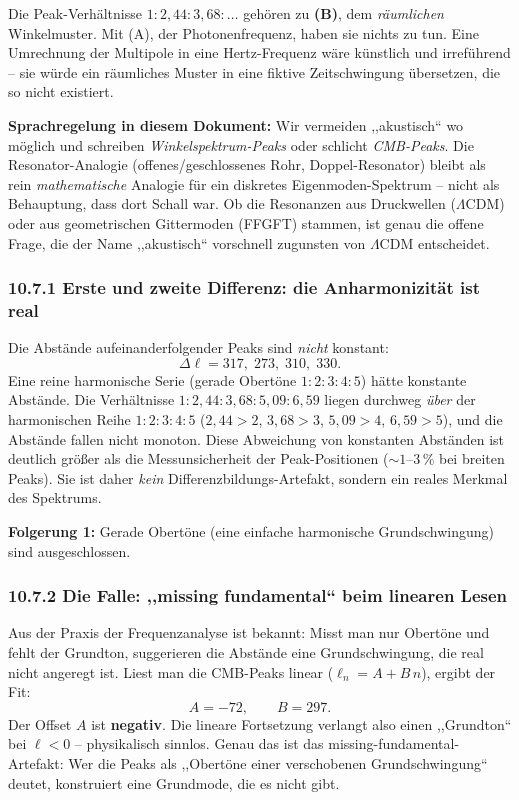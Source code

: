 Die Peak-Verhältnisse $1:2{,}44:3{,}68:\ldots$ gehören zu \textbf{(B)},
dem \emph{räumlichen} Winkelmuster. Mit (A), der Photonenfrequenz, haben
sie nichts zu tun. Eine Umrechnung der Multipole in eine Hertz-Frequenz
wäre künstlich und irreführend -- sie würde ein räumliches Muster in
eine fiktive Zeitschwingung übersetzen, die so nicht existiert.

\textbf{Sprachregelung in diesem Dokument:} Wir vermeiden ,,akustisch``
wo möglich und schreiben \emph{Winkelspektrum-Peaks} oder schlicht
\emph{CMB-Peaks}. Die Resonator-Analogie (offenes/geschlossenes Rohr,
Doppel-Resonator) bleibt als rein \emph{mathematische} Analogie für ein
diskretes Eigenmoden-Spektrum -- nicht als Behauptung, dass dort Schall
war. Ob die Resonanzen aus Druckwellen ($\Lambda$CDM) oder aus
geometrischen Gittermoden (FFGFT) stammen, ist genau die offene Frage,
die der Name ,,akustisch`` vorschnell zugunsten von $\Lambda$CDM
entscheidet.

\subsubsection*{10.7.1 Erste und zweite Differenz: die Anharmonizität ist real}

Die Abstände aufeinanderfolgender Peaks sind \emph{nicht} konstant:
\[
  \Delta\ell = 317,\; 273,\; 310,\; 330.
\]
Eine reine harmonische Serie (gerade Obertöne $1:2:3:4:5$) hätte
konstante Abstände. Die Verhältnisse $1:2{,}44:3{,}68:5{,}09:6{,}59$
liegen durchweg \emph{über} der harmonischen Reihe $1:2:3:4:5$
($2{,}44>2$, $3{,}68>3$, $5{,}09>4$, $6{,}59>5$), und die Abstände fallen
nicht monoton. Diese Abweichung von konstanten Abständen ist deutlich größer
als die Messunsicherheit der Peak-Positionen ($\sim 1$--$3\,\%$ bei breiten
Peaks). Sie ist daher \emph{kein} Differenzbildungs-Artefakt, sondern
ein reales Merkmal des Spektrums.

\textbf{Folgerung 1:} Gerade Obertöne (eine einfache harmonische
Grundschwingung) sind ausgeschlossen.

\subsubsection*{10.7.2 Die Falle: ,,missing fundamental`` beim linearen Lesen}

Aus der Praxis der Frequenzanalyse ist bekannt: Misst man nur Obertöne
und fehlt der Grundton, suggerieren die Abstände eine Grundschwingung,
die real nicht angeregt ist. Liest man die CMB-Peaks linear
($\ell_n = A + B\,n$), ergibt der Fit:
\[
  A = -72, \qquad B = 297.
\]
Der Offset $A$ ist \textbf{negativ}. Die lineare Fortsetzung verlangt
also einen ,,Grundton`` bei $\ell < 0$ -- physikalisch sinnlos. Genau das
ist das missing-fundamental-Artefakt: Wer die Peaks als ,,Obertöne einer
verschobenen Grundschwingung`` deutet, konstruiert eine Grundmode, die
es nicht gibt.

